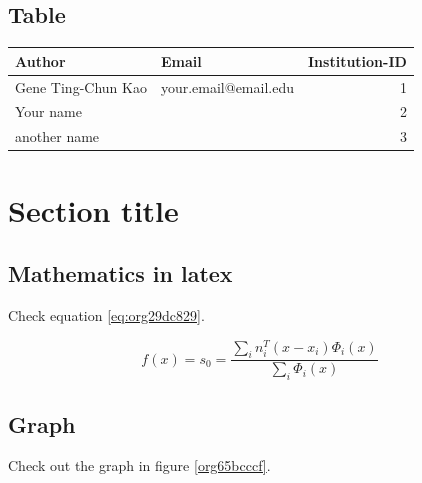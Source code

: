 \documentclass[a4paper,11pt]{article}
\begin{document}
\subsection*{Table}
\label{sec:org447b580}

\begin{center}
\begin{tabular}{llr}
Author & Email & Institution-ID\\
\hline
Gene Ting-Chun Kao & your.email@email.edu & 1\\
Your name &  & 2\\
another name &  & 3\\
\end{tabular}
\end{center}



\section*{Section title}
\label{sec:org8a0dfe4}

\subsection*{Mathematics in latex}
\label{sec:org78ebfe9}

Check equation \ref{eq:org29dc829}.

\begin{equation}
\label{eq:org29dc829}
f(x) = {s_0} = \frac{{\sum\limits_i {n_i^T(x - {x_i}){\Phi _i}(x)} }}{{\sum\limits_i {{\Phi _i}(x)} }}
\end{equation}



\subsection*{Graph}
\label{sec:orgae96de1}

Check out the graph in figure \ref{org65bcccf}.
\end{document}
